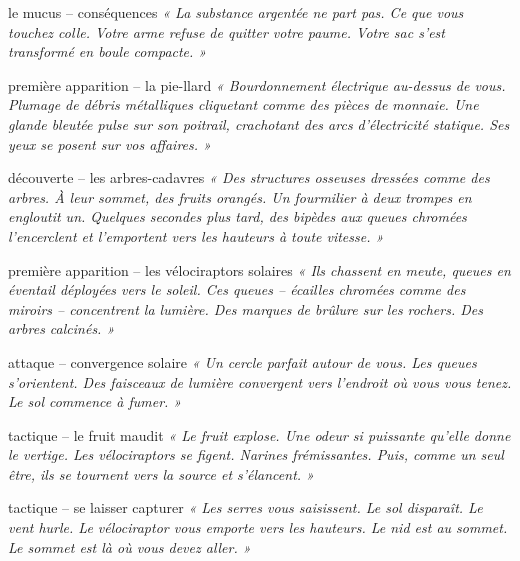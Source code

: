 \documentclass[10pt, a4paper]{article}
\begin{document}
\begin{momentbox}{le mucus -- conséquences}
\textit{« La substance argentée ne part pas. Ce que vous touchez colle. Votre arme refuse de quitter votre paume. Votre sac s'est transformé en boule compacte. »}
\end{momentbox}

\begin{creaturebox}{première apparition -- la pie-llard}
\textit{« Bourdonnement électrique au-dessus de vous. Plumage de débris métalliques cliquetant comme des pièces de monnaie. Une glande bleutée pulse sur son poitrail, crachotant des arcs d'électricité statique. Ses yeux se posent sur vos affaires. »}
\end{creaturebox}

\begin{obstaclebox}{découverte -- les arbres-cadavres}
\textit{« Des structures osseuses dressées comme des arbres. À leur sommet, des fruits orangés. Un fourmilier à deux trompes en engloutit un. Quelques secondes plus tard, des bipèdes aux queues chromées l'encerclent et l'emportent vers les hauteurs à toute vitesse. »}
\end{obstaclebox}

\begin{creaturebox}{première apparition -- les vélociraptors solaires}
\textit{« Ils chassent en meute, queues en éventail déployées vers le soleil. Ces queues -- écailles chromées comme des miroirs -- concentrent la lumière. Des marques de brûlure sur les rochers. Des arbres calcinés. »}
\end{creaturebox}

\begin{momentbox}{attaque -- convergence solaire}
\textit{« Un cercle parfait autour de vous. Les queues s'orientent. Des faisceaux de lumière convergent vers l'endroit où vous vous tenez. Le sol commence à fumer. »}
\end{momentbox}

\begin{momentbox}{tactique -- le fruit maudit}
\textit{« Le fruit explose. Une odeur si puissante qu'elle donne le vertige. Les vélociraptors se figent. Narines frémissantes. Puis, comme un seul être, ils se tournent vers la source et s'élancent. »}
\end{momentbox}

\begin{momentbox}{tactique -- se laisser capturer}
\textit{« Les serres vous saisissent. Le sol disparaît. Le vent hurle. Le vélociraptor vous emporte vers les hauteurs. Le nid est au sommet. Le sommet est là où vous devez aller. »}
\end{momentbox}
\end{document}
